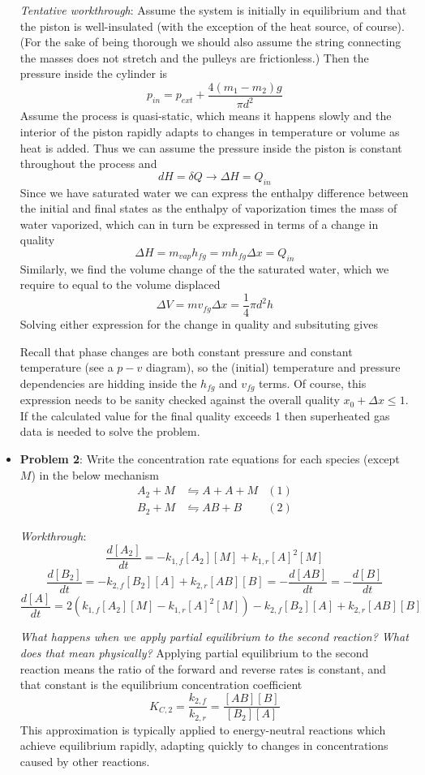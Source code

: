 \documentclass[11pt]{article}
\newcommand{\Item}[1]{\item \textbf{#1}:}
\newcommand{\CenteredBoxed}[1]{\begin{center}\boxed{#1}\end{center}}
\newcommand{\Problem}[1]{\Item{Problem #1}}
\begin{document}
\begin{itemize}
\emph{Tentative workthrough}: Assume the system is initially in equilibrium and that the piston is well-insulated (with the exception of the heat source, of course). (For the sake of being thorough we should also assume the string connecting the masses does not stretch and the pulleys are frictionless.) Then the pressure inside the cylinder is
$$p_{in} = p_{ext} + \frac{4(m_1-m_2)g}{\pi d^2}$$
Assume the process is quasi-static, which means it happens slowly and the interior of the piston rapidly adapts to changes in temperature or volume as heat is added. Thus we can assume the pressure inside the piston is constant throughout the process and
$$dH = \delta Q\to \Delta H = Q_{in}$$
Since we have saturated water we can express the enthalpy difference between the initial and final states as the enthalpy of vaporization times the mass of water vaporized, which can in turn be expressed in terms of a change in quality
$$\Delta H = m_{vap}h_{fg} = mh_{fg}\Delta x = Q_{in}$$
Similarly, we find the volume change of the the saturated water, which we require to equal to the volume displaced
$$\Delta V = mv_{fg}\Delta x = \frac{1}{4}\pi d^2h$$
Solving either expression for the change in quality and subsituting gives
\CenteredBoxed{Q_{in} = \frac{h_{fg}}{v_{fg}}\frac{1}{4}\pi d^2h}
Recall that phase changes are both constant pressure and constant temperature (see a $p-v$ diagram), so the (initial) temperature and pressure dependencies are hidding inside the $h_{fg}$ and $v_{fg}$ terms. Of course, this expression needs to be sanity checked against the overall quality $x_0+\Delta x \leq1$. If the calculated value for the final quality exceeds 1 then superheated gas data is needed to solve the problem.\\

\Problem{2} Write the concentration rate equations for each species (except $M$) in the below mechanism
\begin{align*}
A_2 + M &\leftrightharpoons A + A + M & (1)\\
B_2 + M &\leftrightharpoons AB + B & (2)
\end{align*}

\emph{Workthrough}:
$$\frac{d[A_2]}{dt} = -k_{1,f}[A_2][M] + k_{1,r}[A]^2[M]$$
$$\frac{d[B_2]}{dt} = -k_{2,f}[B_2][A] + k_{2,r}[AB][B] = -\frac{d[AB]}{dt} = -\frac{d[B]}{dt}$$
$$\frac{d[A]}{dt} = 2(k_{1,f}[A_2][M] - k_{1,r}[A]^2[M]) -k_{2,f}[B_2][A] + k_{2,r}[AB][B]$$

\emph{What happens when we apply partial equilibrium to the second reaction? What does that mean physically?} Applying partial equilibrium to the second reaction means the ratio of the forward and reverse rates is constant, and that constant is the equilibrium concentration coefficient
$$K_{C,2} = \frac{k_{2,f}}{k_{2,r}} = \frac{[AB][B]}{[B_2][A]}$$
This approximation is typically applied to energy-neutral reactions which achieve equilibrium rapidly, adapting quickly to changes in concentrations caused by other reactions.


\end{itemize}
\end{document}
